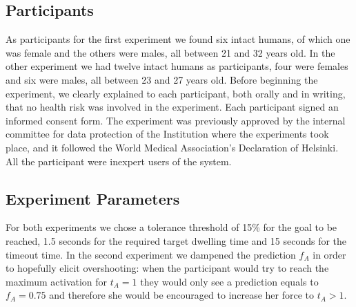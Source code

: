 \subsection{Participants}\label{subsec:exp-participants}
As participants for the first experiment we found six intact humans, of which one was female and the others were males, all between 21 and 32 years old. In the other experiment we had twelve intact humans as participants, four were females and six were males, all between 23 and 27 years old. Before beginning the experiment, we clearly explained to each participant, both orally and in writing, that no health risk was involved in the experiment.  Each participant signed an informed consent form. The experiment was previously approved by the internal committee for data protection of the Institution where the experiments took place, and it followed the World Medical Association’s Declaration of Helsinki. All the participant were inexpert users of the system.
\subsection{Experiment Parameters}\label{subsec:exp-parameters}
For both experiments we chose a tolerance threshold of 15\% for the goal to be reached, 1.5 seconds for the required target dwelling time and 15 seconds for the timeout time. In the second experiment we dampened the prediction $f_A$ in order to hopefully elicit overshooting: when the participant would try to reach the maximum activation for $t_A = 1$ they would only see a prediction equals to $f_A = 0.75$ and therefore she would be encouraged to increase her force to $t_A > 1$.  
%
%
%
%
%
